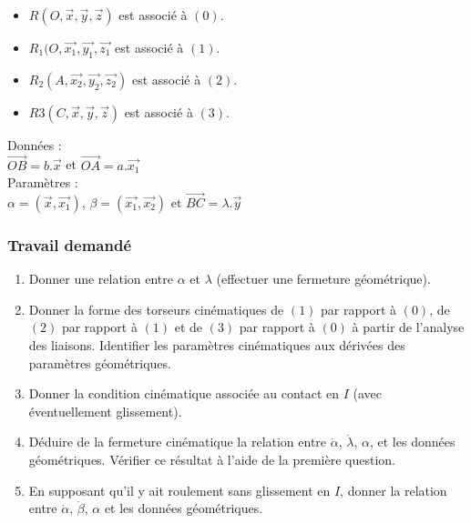\begin{itemize}
\item $R(O,\overrightarrow{x},\overrightarrow{y},\overrightarrow{z})$ est associé à $(0)$.
\item $R_1(O,\overrightarrow{x_1},\overrightarrow{y_1},\overrightarrow{z_1}$ est associé à $(1)$.
\item $R_2(A,\overrightarrow{x_2},\overrightarrow{y_2},\overrightarrow{z_2})$ est associé à $(2)$.
\item $R3(C,\overrightarrow{x},\overrightarrow{y},\overrightarrow{z})$ est associé à $(3)$.
\end{itemize}

Données :\\
$\overrightarrow{OB}=b.\overrightarrow{x}$ et $\overrightarrow{OA}=a.\overrightarrow{x_1}$\\
Paramètres :\\
$\alpha=(\overrightarrow{x},\overrightarrow{x_1})$, $\beta=(\overrightarrow{x_1},\overrightarrow{x_2})$ et $\overrightarrow{BC}=\lambda.\overrightarrow{y}$

\subsubsection{Travail demandé}
\begin{enumerate}
\item Donner une relation entre $\alpha$ et $\lambda$ (effectuer une fermeture géométrique).
\item Donner la forme des torseurs cinématiques de $(1)$ par rapport à $(0)$, de $(2)$ par rapport à $(1)$ et de $(3)$ par rapport à $(0)$ à partir de l’analyse des liaisons. Identifier les paramètres cinématiques aux dérivées des paramètres géométriques.
\item Donner la condition cinématique associée au contact en $I$ (avec éventuellement glissement).
\item Déduire de la fermeture cinématique la relation entre $\dot{\alpha}$, $\dot{\lambda}$, $\alpha$, et les données géométriques. Vérifier ce résultat à l'aide de la première question.
\item En supposant qu'il y ait roulement sans glissement en $I$, donner la relation entre $\dot{\alpha}$, $\dot{\beta}$, $\alpha$ et les données géométriques.
\end{enumerate}

